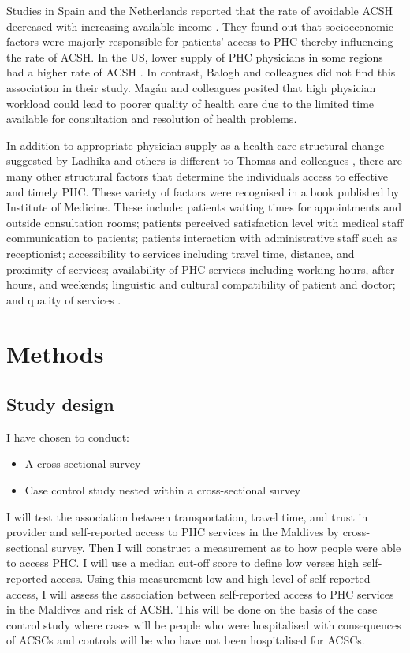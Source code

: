 Studies in Spain and the Netherlands reported that the rate of avoidable ACSH decreased with increasing available income \cite{magan2011hospitalizations,paul2018admissions}. They found out that socioeconomic factors were majorly responsible for patients’ access to PHC thereby influencing the rate of ACSH. In the US, lower supply of PHC physicians in some regions had a higher rate of ACSH \cite{laditka2005more}. In contrast, Balogh and colleagues \citeyear{balogh2013factors} did not find this association in their study. Magán and colleagues \citeyear{magan2011hospitalizations} posited that high physician workload could lead to poorer quality of health care due to the limited time available for consultation and resolution of health problems.

In addition to appropriate physician supply as a health care structural change suggested by Ladhika and others is different to Thomas and colleagues \cite{laditka2005more}, there are many other structural factors that determine the individuals access to effective and timely PHC. These variety of factors were recognised in a book published by Institute of Medicine. These include: patients waiting times for appointments and outside consultation rooms; patients perceived satisfaction level with medical staff communication to patients; patients interaction with administrative staff such as receptionist; accessibility to services including travel time, distance, and proximity of services; availability of PHC services including working hours, after hours, and weekends; linguistic and cultural compatibility of patient and doctor; and quality of services \cite{millman1993access}.

\chapter{Methods}

\section{Study design}

I have chosen to conduct:

\begin{itemize}
    \item A cross-sectional survey
    \item Case control study nested within a cross-sectional survey 
\end{itemize}

I will test the association between transportation, travel time, and trust in provider and self-reported access to PHC services in the Maldives by cross-sectional survey. Then I will construct a measurement as to how people were able to access PHC. I will use a median cut-off score to define low verses high self-reported access. Using this measurement low and high level of self-reported access, I will assess the association between self-reported access to PHC services in the Maldives and risk of ACSH. This will be done on the basis of the case control study where cases will be people who were hospitalised with consequences of ACSCs and controls will be who have not been hospitalised for ACSCs.

